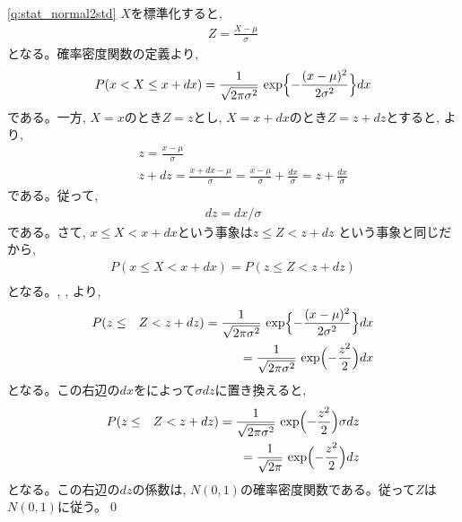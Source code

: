 \ref{q:stat_normal2std} $X$を標準化すると, 
\begin{eqnarray}
Z=\frac{X-\mu}{\sigma}\label{q:stat_normal2std_ans0}
\end{eqnarray}
となる。確率密度関数の定義より, 
\begin{eqnarray}
P(x< X\leq x+dx)=\frac{1}{\sqrt{2\pi \sigma^2}}\,\exp\Bigl\{-\frac{(x-\mu)^2}{2\sigma^2}\Bigr\}dx\nonumber\\\label{q:stat_normal2std_ans3}
\end{eqnarray}
である。一方, $X=x$のとき$Z=z$とし, $X=x+dx$のとき$Z=z+dz$とすると, より, 
\begin{eqnarray}
&&z=\frac{x-\mu}{\sigma}\label{q:stat_normal2std_ans35}\\
&&z+dz=\frac{x+dx-\mu}{\sigma}=\frac{x-\mu}{\sigma}+\frac{dx}{\sigma}=z+\frac{dx}{\sigma}\nonumber
\end{eqnarray}
である。従って, 
\begin{eqnarray}
dz=dx/\sigma\label{q:stat_normal2std_ans4}
\end{eqnarray}
である。さて, $x\leq X<x+dx$という事象は$z\leq Z<z+dz$
という事象と同じだから, 
\begin{eqnarray}
P(x\leq X< x+dx)=P(z\leq Z<z+dz)\nonumber\\\label{q:stat_normal2std_ans6}
\end{eqnarray}
となる。, , より, 
\begin{eqnarray}
P(z\leq &&Z< z+dz)=\frac{1}{\sqrt{2\pi \sigma^2}}\,\exp\Bigl\{-\frac{(x-\mu)^2}{2\sigma^2}\Bigr\}dx\nonumber\\
&&=\frac{1}{\sqrt{2\pi \sigma^2}}\,\exp\Bigl(-\frac{z^2}{2}\Bigr)dx
\end{eqnarray}
となる。この右辺の$dx$をによって$\sigma dz$に置き換えると, 
\begin{eqnarray}
P(z\leq &&Z< z+dz)=\frac{1}{\sqrt{2\pi \sigma^2}}\,\exp\Bigl(-\frac{z^2}{2}\Bigr)\sigma dz\nonumber\\
&&=\frac{1}{\sqrt{2\pi}}\,\exp\Bigl(-\frac{z^2}{2}\Bigr) dz
\end{eqnarray}
となる。この右辺の$dz$の係数は, $N(0, 1)$の確率密度関数である。従って$Z$は$N(0, 1)$に従う。\qed
\mv


